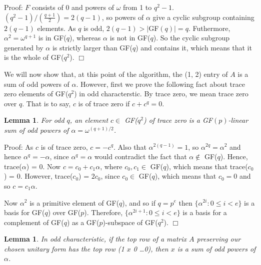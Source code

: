 \documentclass[12pt]{report}
\newtheorem{lemma}[definition]{Lemma}
\newenvironment{proof}{\normalsize {\sc Proof}:}{{\hfill $\Box$ \\}}
\begin{document}
\begin{proof}
$F$ consists of 0 and powers of $\omega$ from 1 to $q^2 - 1$. $(q^2 - 1) / (\frac{q + 1}{2}) = 2(q - 1)$, so powers of $\alpha$ give a cyclic subgroup containing $2(q - 1)$ elements. As $q$ is odd, $2(q-1) > |$GF$(q)| = q$. Futhermore, $\alpha^2 = \omega^{q+1}$ is in GF($q$), whereas $\alpha$ is not in GF($q$). So the cyclic subgroup generated by $\alpha$ is strictly larger than GF($q$) and contains it, which means that it is the whole of GF($q^2$).
\end{proof}

We will now show that, at this point of the algorithm, the (1, 2) entry of $A$ is a sum of odd powers of $\alpha$. However, first we prove the following fact about trace zero elements of GF($q^2$) in odd characterstic. By trace zero, we mean trace zero over $q$. That is to say, $c$ is of trace zero if $c + c^q = 0$.

\begin{lemma}
For odd $q$, an element $c \in$ GF($q^2$) of trace zero is a GF$(p)$-linear sum of odd powers of $\alpha = \omega^{(q+1)/2}$.
\end{lemma}

\begin{proof}
As $c$ is of trace zero, $c = -c^q$. Also that $\alpha^{2(q-1)} = 1$, so $\alpha^{2q} = \alpha^2$ and hence $\alpha^q = - \alpha$, since $\alpha^q = \alpha$ would contradict the fact that $\alpha \notin$ GF($q$). Hence, trace($\alpha$) = 0. Now $c = c_0 + c_1 \alpha$, where $c_0, c_1 \in$ GF($q$), which means that trace($c_0$) = 0. However, trace($c_0$) = $2 c_0$, since $c_0 \in$ GF($q$), which means that $c_0 = 0$ and so $c = c_1 \alpha$.

Now $\alpha^2$ is a primitive element of GF($q$), and so if $q = p^e$ then $\{ \alpha^{2i} : 0 \le i < e\}$ is a basis for GF($q$) over GF($p$). Therefore, $\{ \alpha^{2i+1} : 0 \le i < e \}$ is a basis for a complement of GF($q$) as a GF($p$)-subspace of GF($q^2$).
\end{proof}

\begin{lemma}
In odd characteristic, if the top row of a matrix $A$ preserving our chosen unitary form has the top row (1 $x$ 0 \ldots 0), then $x$ is a sum of odd powers of $\alpha$.
\end{lemma}
\end{document}

